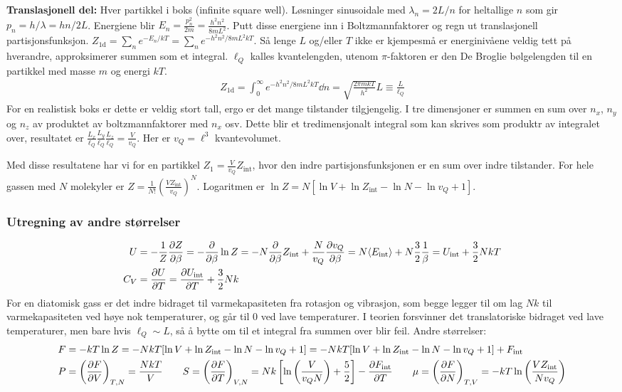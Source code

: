 \documentclass[12pt]{article}
\newcommand{\mean}[1]{\langle #1 \rangle}
\begin{document}
\textbf{Translasjonell del:} Hver partikkel i boks (infinite square well). Løsninger
sinusoidale med $\lambda_n = 2L / n$ for heltallige $n$ som gir $p_n = h / \lambda = hn/2L$.
Energiene blir $E_n = \frac{p_n^2}{2m} = \frac{h^2 n^2}{8mL^2}$. Putt disse energiene
inn i Boltzmannfaktorer og regn ut translasjonell partisjonsfunksjon. $Z_\text{1d} = \sum_n e^{-E_n / kT} = \sum_n e^{-h^2 n^2 / 8mL^2 kT}$.
Så lenge $L$ og/eller $T$ ikke er kjempesmå er energinivåene veldig tett på hverandre,
approksimerer summen som et integral. $\ell_Q$ kalles kvantelengden, utenom $\pi$-faktoren
er den De Broglie bølgelengden til en partikkel med masse $m$ og energi $kT$.
\begin{align*}
  Z_\text{1d} = \int_0^\infty e^{-h^2 n^2 / 8mL^2 kT} \dd n = \sqrt{\frac{2\pi m k T}{h^2}}L \equiv \frac{L}{\ell_Q}
\end{align*}
For en realistisk boks er dette er veldig stort tall, ergo er det mange tilstander tilgjengelig.
I tre dimensjoner er summen en sum over $n_x$, $n_y$ og $n_z$ av produktet av boltzmannfaktorer med $n_x$ osv.
Dette blir et tredimensjonalt integral som kan skrives som produktr av integralet over, resultatet er
$\frac{L_x}{\ell_Q}\frac{L_y}{\ell_Q}\frac{L_z}{\ell_Q} = \frac{V}{v_Q}$. Her er $v_Q = \ell^3$ kvantevolumet.

Med disse resultatene har vi for en partikkel $Z_1 = \frac{V}{v_Q} Z_\text{int}$,
hvor den indre partisjonsfunksjonen er en sum over indre tilstander. For hele gassen med $N$ molekyler
er $Z = \frac{1}{N!} \left( \frac{V Z_\text{int}}{v_Q} \right)^N$. Logaritmen er $\ln Z = N[\ln V + \ln Z_\text{int} - \ln N - \ln v_Q + 1]$.
\subsubsection{Utregning av andre størrelser}
\begin{align*}
  U   &= - \frac{1}{Z}\pdv{Z}{\beta} = -\pdv{\beta} \ln{Z} = -N \pdv{\beta} Z_\text{int} + \frac{N}{v_Q} \pdv{v_Q}{\beta} = N \mean{E_\text{int}} + N \frac{3}{2}\frac{1}{\beta} = U_\text{int} + \frac{3}{2}NkT \\
  C_V &= \pdv{U}{T} = \pdv{U_\text{int}}{T} + \frac{3}{2}Nk
\end{align*}
For en diatomisk gass er det indre bidraget til varmekapasiteten fra rotasjon og vibrasjon, som begge legger til om lag $Nk$ til
varmekapasiteten ved høye nok temperaturer, og går til $0$ ved lave temperaturer. I teorien
forsvinner det translatoriske bidraget ved lave temperaturer, men bare hvis $\ell_Q \sim L$, så
å bytte om til et integral fra summen over blir feil. Andre størrelser:
\begin{align*}
  F   &= -kT\ln{Z} = -NkT[\ln V + \ln Z_\text{int} - \ln{N} - \ln{v_Q} + 1] = -NkT [\ln V + \ln Z_\text{int} - \ln{N} - \ln{v_Q} + 1] + F_\text{int} \\
  P   &= \left( \pdv{F}{V} \right)_{T,N} = \frac{NkT}{V} \qquad
  S   = \left( \pdv{F}{T} \right)_{V,N} = Nk \left[ \ln{\left( \frac{V}{v_Q N} \right)} + \frac{5}{2} \right] - \pdv{F_\text{int}}{T} \qquad
  \mu = \left( \pdv{F}{N} \right)_{T,V} = -kT \ln{\left( \frac{V Z_\text{int}}{N v_Q} \right)}
\end{align*}
\end{document}
